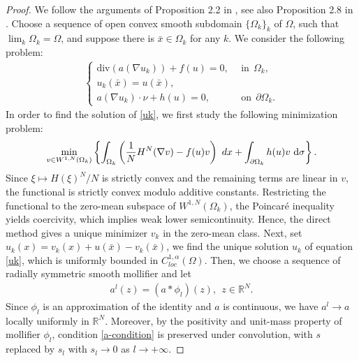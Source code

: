 \documentclass[10pt,a4paper]{amsart}
\numberwithin{equation}{section}
\newcommand{\pa}{\partial}
\newcommand{\R}{\mathbb{R}}
\newcommand{\dx}{\textup{d}x}
\begin{document}
\begin{proof}
    We follow the arguments of Proposition 2.2 in \cite{CCR2021}, see also Proposition 2.8 in \cite{CFR2020}. Choose a sequence of open convex smooth subdomain $\{\Omega_k\}_k$ of $\Omega$, such that $\lim_k \Omega_k = \Omega$, and suppose there is $\bar{x} \in \Omega_k$ for any $k$. We consider the following problem:
    \begin{align}\label{uk}
        \begin{cases}
            \text{div} (a(\nabla u_k )) + f(u) = 0, \ \ & \text{in} \ \ \Omega_k, \\
            u_k(\bar{x}) = u(\bar{x}), \\
            a(\nabla u_k) \cdot \nu + h(u) = 0, \ \ & \text{on} \ \ \pa \Omega_k.
        \end{cases}
    \end{align}
  In order to find the solution of \eqref{uk}, we first study the following minimization problem:
    \begin{align*}
        \min\limits_{v \in W^{1,N}(\Omega_k)} \left\{ \int_{\Omega_k} \left( \frac{1}{N}H^N(\nabla v) - f(u)v \right) \ \dx + \int_{\pa \Omega_k} h(u) v \ \text{d} \sigma \right\}.
    \end{align*}
    Since $\xi\mapsto H(\xi)^N/N$ is strictly convex and the remaining terms are linear in $v$, the functional is strictly convex modulo additive constants. Restricting the functional to the zero-mean subspace of $W^{1,N}(\Omega_k)$, the Poincaré inequality yields coercivity, which implies weak lower semicontinuity. Hence, the direct method gives a unique minimizer $v_k$ in the zero-mean class. Next, set $u_k(x) = v_k(x) + u(\bar{x}) - v_k(\bar{x})$, we find the unique solution $u_k$ of equation \eqref{uk}, which is uniformly bounded in $C^{1,\alpha}_{loc}(\Omega)$. Then, we choose a sequence of radially symmetric smooth mollifier and let
    \begin{align*}
        a^l(z) = (a * \phi_l)(z), \ \ z \in \R^N.
    \end{align*}
     Since ${\phi_l}$ is an approximation of the identity and $a$ is continuous, we have $a^l \to a$ locally uniformly in $\mathbb R^N$. Moreover, by the positivity and unit-mass property of mollifier $\phi_l$, condition \eqref{a-condition} is preserved under convolution, with $s$ replaced by $s_l$ with $s_l  \to 0$ as $l \to +\infty$.
      

\end{proof}
\end{document}
